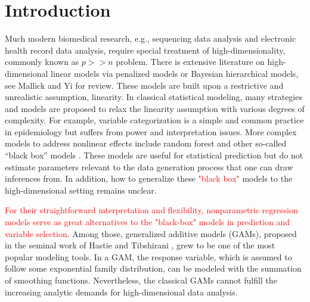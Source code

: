 \documentclass[AMA,STIX1COL,]{WileyNJD-v2}
\begin{document}
\maketitle

\pgfplotsset{compat=1.18}
\usetikzlibrary{shapes.geometric, arrows, positioning, calc, matrix, backgrounds, fit}
\newcommand{\bs}[1]{\boldsymbol{#1}}
\newcommand{\tp}{*}
\newcommand{\pr}{\text{Pr}}
\newcommand{\repa}{\text{repa}}
\newcommand{\simiid}{\overset{\text{iid}}{\sim}}
\newcommand{\bg}[1]{\textcolor{red}{#1}}

\section{Introduction}
\label{sec:intro}

Much modern biomedical research, e.g., sequencing data analysis and
electronic health record data analysis, require special treatment of
high-dimensionality, commonly known as \(p >> n\) problem. There is
extensive literature on high-dimensional linear models via penalized
models or Bayesian hierarchical models, see Mallick and Yi
\citep{Mallick2013} for review. These models are built upon a
restrictive and unrealistic assumption, linearity. In classical
statistical modeling, many strategies and models are proposed to relax
the linearity assumption with various degrees of complexity. For
example, variable categorization is a simple and common practice in
epidemiology but suffers from power and interpretation issues. More
complex models to address nonlinear effects include random forest and
other so-called ``black box'' models \citep{Breiman2001}. These models
are useful for statistical prediction but do not estimate parameters
relevant to the data generation process that one can draw inferences
from. In addition, how to generalize these \textcolor{red}{"black box"}
models to the high-dimensional setting remains unclear.

\textcolor{red}{For their straightforward interpretation and flexibility, nonparametric regression models serve as great alternatives to the "black-box" models in prediction and variable selection}.
Among those, generalized additive models (GAMs), proposed in the seminal
work of Hastie and Tibshirani \citep{Hastie1987}, grew to be one of the
most popular modeling tools. In a GAM, the response variable, which is
assumed to follow some exponential family distribution, can be modeled
with the summation of smoothing functions. Nevertheless, the classical
GAMs cannot fulfill the increasing analytic demands for high-dimensional
data analysis.
\end{document}
